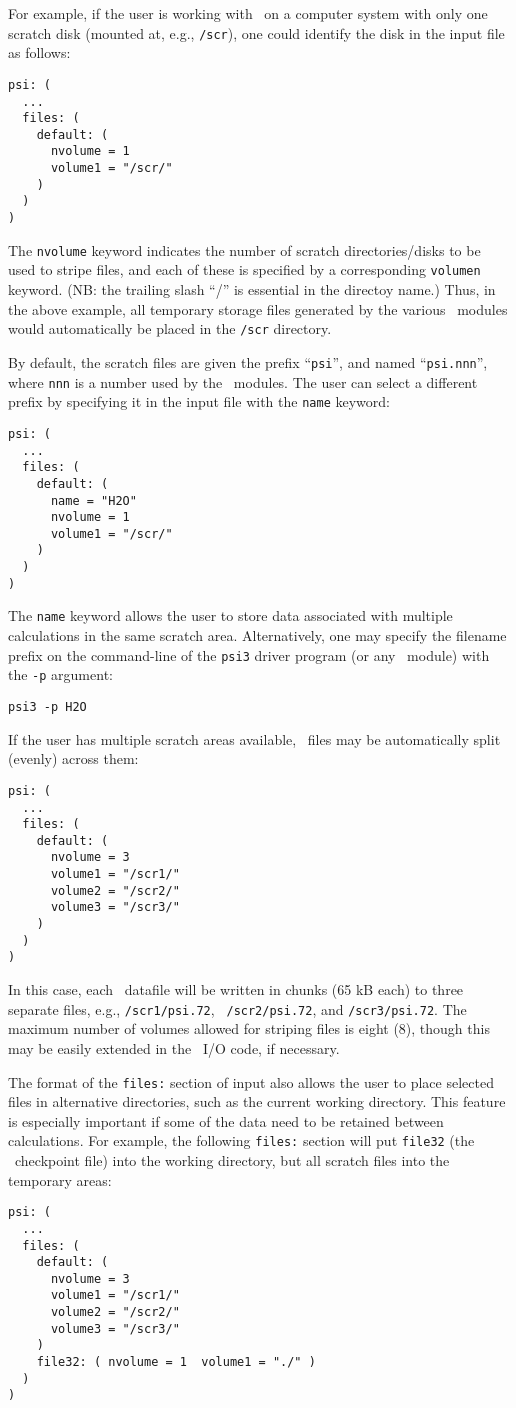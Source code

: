 For example, if the user is working with \PSIthree\ on a computer
system with only one scratch disk (mounted at, e.g., {\tt /scr}), one
could identify the disk in the input file as follows:
\begin{verbatim}
psi: (
  ...
  files: (
    default: (
      nvolume = 1
      volume1 = "/scr/"
    )
  )
)
\end{verbatim}
The {\tt nvolume} keyword indicates the number of scratch
directories/disks to be used to stripe files, and each of these is
specified by a corresponding {\tt volumen} keyword.  (NB: the trailing
slash ``/'' is essential in the directoy name.)  Thus, in the above
example, all temporary storage files generated by the various
\PSIthree\ modules would automatically be placed in the {\tt /scr}
directory.  

By default, the scratch files are given the prefix ``{\tt psi}'', and
named ``{\tt psi.nnn}'', where {\tt nnn} is a number used by the
\PSIthree\ modules.  The user can select a different prefix by
specifying it in the input file with the {\tt name} keyword:
\begin{verbatim}
psi: (
  ...
  files: (
    default: (
      name = "H2O"
      nvolume = 1
      volume1 = "/scr/"
    )
  )
)
\end{verbatim}
The {\tt name} keyword allows the user to store data associated with
multiple calculations in the same scratch area.  Alternatively, one
may specify the filename prefix on the command-line of the {\tt psi3}
driver program (or any \PSIthree\ module) with the {\tt -p} argument:
\begin{verbatim}
psi3 -p H2O
\end{verbatim}

If the user has multiple scratch areas available, \PSIthree\ files may
be automatically split (evenly) across them:
\begin{verbatim}
psi: (
  ...
  files: (
    default: (
      nvolume = 3
      volume1 = "/scr1/"
      volume2 = "/scr2/"
      volume3 = "/scr3/"
    )
  )
)
\end{verbatim}
In this case, each \PSIthree\ datafile will be written in chunks (65
kB each) to three separate files, e.g., {\tt /scr1/psi.72}, {\tt
/scr2/psi.72}, and {\tt /scr3/psi.72}.  The maximum number of volumes
allowed for striping files is eight (8), though this may be easily
extended in the \PSIthree\ I/O code, if necessary.

The format of the {\tt files:} section of input also allows the user to
place selected files in alternative directories, such as the current
working directory.  This feature is especially important if some of
the data need to be retained between calculations.  For example, the
following {\tt files:} section will put {\tt file32} (the \PSIthree\
checkpoint file) into the working directory, but all scratch files
into the temporary areas:
\begin{verbatim}
psi: (
  ...
  files: (
    default: (
      nvolume = 3
      volume1 = "/scr1/"
      volume2 = "/scr2/"
      volume3 = "/scr3/"
    )
    file32: ( nvolume = 1  volume1 = "./" )
  )
)
\end{verbatim}

